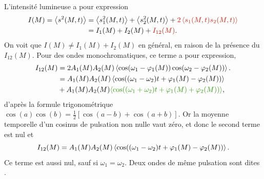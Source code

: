 \documentclass[12pt,fancy]{cours}
\begin{document}
L'intensité lumineuse a pour expression
\begin{equation}
  \begin{split}
    I(M) = \avg{\vib^2(M,t)} & = \avg{\vib_1^2(M,t)}+\avg{\vib_2^2(M,t)}+\JRouge{2\avg{\vib_1(M,t)\vib_2(M,t)}} \\ 
    & = I_1(M) + I_2(M) + \JRouge{I_{12}(M)}.
  \end{split}
\end{equation}
On voit que $I(M) \neq I_1(M)+I_2(M)$ en général, en raison de la présence du  $I_{12}(M)$. Pour des ondes monochromatiques, ce terme a pour expression,
\begin{equation}
  \begin{split}
    I_{12}(M) &= 2A_1(M) A_2(M)\avg{ \cos(\omega_1 -\varphi_1(M)) \cos(\omega_2 -\varphi_2(M))}. \\ 
    & = A_1(M) A_2(M)\avg{ \cos((\omega_1 - \omega_2)t+\varphi_1(M)-\varphi_2(M))}  \\ 
    & + A_1(M) A_2(M)\JVert{\avg{ \cos((\omega_1 + \omega_2)t+\varphi_1(M)+\varphi_2(M))}},
  \end{split}
\end{equation}
d'après la formule trigonométrique $\cos(a)\cos(b)=\frac{1}{2}[\cos(a-b)+\cos(a+b)]$. Or la moyenne temporelle d'un cosinus de pulsation non nulle vaut zéro, et donc le second terme est nul et 
\begin{equation}
  I_{12}(M) = A_1(M) A_2(M)\left\langle { \cos((\omega_1 - \omega_2)t+\varphi_1(M)-\varphi_2(M))} \right\rangle.
\end{equation}
Ce terme est aussi nul, sauf si $\omega_1=\omega_2$. Deux ondes de même pulsation sont dites .
\end{document}
